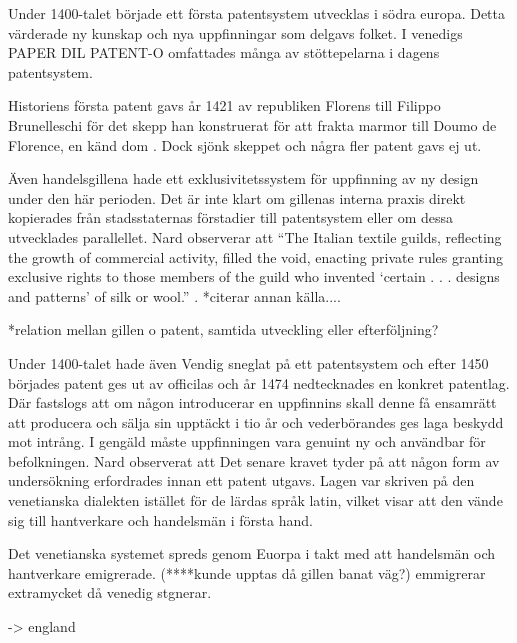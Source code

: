 Under 1400-talet började ett första patentsystem utvecklas i södra europa. 
Detta värderade ny kunskap och nya uppfinningar som delgavs folket. 
I venedigs PAPER DIL PATENT-O omfattades många av stöttepelarna i dagens patentsystem. 


Historiens första patent gavs år 1421 av republiken Florens till Filippo Brunelleschi för det skepp han konstruerat för att frakta marmor till Doumo de Florence, en känd dom \cite{frumkin}. 
Dock sjönk skeppet och några fler patent gavs ej ut. 

Även handelsgillena hade ett exklusivitetssystem för uppfinning av ny design under den här perioden. Det är inte klart om gillenas interna praxis direkt kopierades från stadsstaternas förstadier till patentsystem eller om dessa utvecklades parallellet. Nard observerar att ``The Italian textile guilds, reflecting the growth of commercial activity, filled the void, enacting private rules granting exclusive rights to those members of the guild who invented ‘certain . . . designs and patterns' of silk or wool.'' \cite{nard}. *citerar annan källa....

*relation mellan gillen o patent, samtida utveckling eller efterföljning?

Under 1400-talet hade även Vendig sneglat på ett patentsystem och efter 1450 börjades patent ges ut av officilas och år 1474 nedtecknades en konkret patentlag\cite{frumkin}. 
Där fastslogs att om någon introducerar en uppfinnins skall denne få ensamrätt att producera och sälja sin upptäckt i tio år och vederbörandes ges laga beskydd mot intrång. 
I gengäld måste uppfinningen vara genuint ny och användbar för befolkningen. 
Nard observerat att Det senare kravet tyder på att någon form av undersökning erfordrades innan ett patent utgavs\cite{nard}. 
Lagen var skriven på den venetianska dialekten istället för de lärdas språk latin, vilket visar att den vände sig till hantverkare och handelsmän i första hand.

Det venetianska systemet spreds genom Euorpa i takt med att handelsmän och hantverkare emigrerade. 
(****kunde upptas då gillen banat väg?) emmigrerar extramycket då venedig stgnerar\cite{nard}.

-> england


